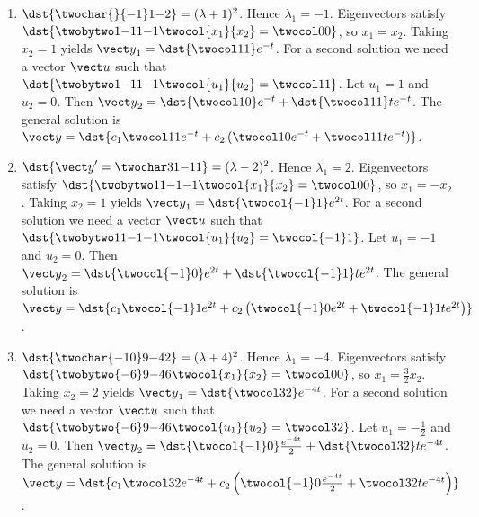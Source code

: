 \documentclass[openany]{book}
\newenvironment{sectionSolutions}{
 \begin{enumerate}[item-label={\thesection.\arabic{enumi}.}]
}{
 \end{enumerate}
}
\begin{document}
\begin{sectionSolutions}
\item
$\dst{\twochar{}{-1}1{-2}}=(\lambda+1)^2$.
Hence $\lambda_1=-1$.
Eigenvectors   satisfy
$\dst{\twobytwo1{-1}1{-1}\twocol{x_1}{x_2}=\twocol00}$,
so $x_1=x_2$.  Taking $x_2=1$ yields
${\vect y}_1=\dst{\twocol11}e^{-t}$.
For a second solution we need a vector ${\vect u}$
such that $\dst{\twobytwo1{-1}1{-1}\twocol{u_1}{u_2}
=\twocol11}$. Let $u_1=1$ and $u_2=0$. Then
${\vect y}_2=\dst{\twocol10}e^{-t}+\dst{\twocol11}te^{-t}$.
The general solution is
${\vect y}=\dst{
c_1\twocol11e^{-t}+c_2\left(\twocol10e^{-t}+\twocol11te^{-t}\right)}$.

\item
 $\dst{{\vect y}'=\twochar31{-1}1}=(\lambda-2)^2$.
Hence $\lambda_1=2$.
Eigenvectors   satisfy
$\dst{\twobytwo11{-1}{-1}\twocol{x_1}{x_2}=\twocol00}$,
so $x_1=-x_2$.  Taking $x_2=1$ yields
${\vect y}_1=\dst{\twocol{-1}1}e^{2t}$.
For a second solution we need a vector ${\vect u}$
such that $\dst{\twobytwo11{-1}{-1}\twocol{u_1}{u_2}
=\twocol{-1}1}$. Let $u_1=-1$ and $u_2=0$. Then
${\vect y}_2=\dst{\twocol{-1}0}e^{2t}+\dst{\twocol{-1}1}te^{2t}$.
The general solution is
 ${\vect y}=\dst{
c_1\twocol{-1}1e^{2t}+c_2\left(\twocol{-1}0
e^{2t}+\twocol{-1}1te^{2t}\right)}$.


\item
$\dst{\twochar{-10}9{-4}2}=(\lambda+4)^2$.
Hence $\lambda_1=-4$.
Eigenvectors   satisfy
$\dst{\twobytwo{-6}9{-4}6\twocol{x_1}{x_2}=\twocol00}$,
so $x_1=\frac{3}{2}x_2$.  Taking $x_2=2$ yields
${\vect y}_1=\dst{\twocol32}e^{-4t}$.
For a second solution we need a vector ${\vect u}$
such that $\dst{\twobytwo{-6}9{-4}6\twocol{u_1}{u_2}
=\twocol32}$. Let $u_1=-\frac{1}{2}$ and $u_2=0$. Then
${\vect y}_2=\dst{\twocol{-1}0}\frac{e^{-4t}}{2}+\dst{\twocol32}te^{-4t}$.
The general solution is
${\vect y}=\dst{c_1\twocol32e^{-4t}+
c_2\left(\twocol{-1}0\frac{e^{-4t}}{2}+\twocol32te^{-4t}\right)}$.



\end{sectionSolutions}
\end{document}
